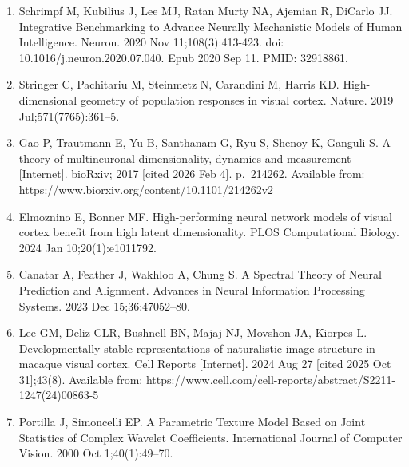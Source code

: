 \documentclass[
  letterpaper,
  DIV=11,
  numbers=noendperiod]{scrartcl}
\providecommand{\tightlist}{%
  \setlength{\itemsep}{0pt}\setlength{\parskip}{0pt}}
\begin{document}
\begin{enumerate}
\def\labelenumi{\arabic{enumi}.}
\tightlist
\item
  Schrimpf M, Kubilius J, Lee MJ, Ratan Murty NA, Ajemian R, DiCarlo JJ.
  Integrative Benchmarking to Advance Neurally Mechanistic Models of
  Human Intelligence. Neuron. 2020 Nov 11;108(3):413-423. doi:
  10.1016/j.neuron.2020.07.040. Epub 2020 Sep 11. PMID: 32918861.
\item
  Stringer C, Pachitariu M, Steinmetz N, Carandini M, Harris KD.
  High-dimensional geometry of population responses in visual cortex.
  Nature. 2019 Jul;571(7765):361--5.
\item
  Gao P, Trautmann E, Yu B, Santhanam G, Ryu S, Shenoy K, Ganguli S. A
  theory of multineuronal dimensionality, dynamics and measurement
  {[}Internet{]}. bioRxiv; 2017 {[}cited 2026 Feb 4{]}. p.~214262.
  Available from: https://www.biorxiv.org/content/10.1101/214262v2
\item
  Elmoznino E, Bonner MF. High-performing neural network models of
  visual cortex benefit from high latent dimensionality. PLOS
  Computational Biology. 2024 Jan 10;20(1):e1011792.
\item
  Canatar A, Feather J, Wakhloo A, Chung S. A Spectral Theory of Neural
  Prediction and Alignment. Advances in Neural Information Processing
  Systems. 2023 Dec 15;36:47052--80.
\item
  Lee GM, Deliz CLR, Bushnell BN, Majaj NJ, Movshon JA, Kiorpes L.
  Developmentally stable representations of naturalistic image structure
  in macaque visual cortex. Cell Reports {[}Internet{]}. 2024 Aug 27
  {[}cited 2025 Oct 31{]};43(8). Available from:
  https://www.cell.com/cell-reports/abstract/S2211-1247(24)00863-5
\item
  Portilla J, Simoncelli EP. A Parametric Texture Model Based on Joint
  Statistics of Complex Wavelet Coefficients. International Journal of
  Computer Vision. 2000 Oct 1;40(1):49--70.
\end{enumerate}
\end{document}
